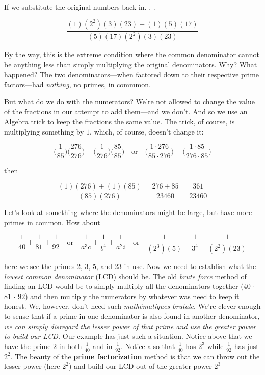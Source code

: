 \documentclass[koma]{article}
\begin{document}
\begin{itemize}
If we substitute the original numbers back in. . .

\[
  \frac{(1)(2^2)(3)(23) + (1)(5)(17)}{(5)(17)(2^2)(3)(23)}
  \]

By the way, this is the extreme condition where the common denominator cannot be anything less than simply multiplying the original denominators. Why? What happened? The two denominators---when factored down to their respective prime factors---had \emph{nothing}, no primes, in commmon.

But what do we do with the numerators? We're not allowed to change the value of the fractions in our attempt to add them---and we don't. And so we use an Algebra trick to keep the fractions the same value. The trick, of course, is multiplying something by \(1\), which, of course, doesn't change it:

\[
  \bigg(\frac{1}{85}\bigg)\bigg(\frac{276}{276}\bigg) + \bigg(\frac{1}{276}\bigg)\bigg(\frac{85}{85}\bigg) \quad \textrm{or} \quad  \bigg(\frac{1\cdot276}{85\cdot276}\bigg) + \bigg(\frac{1\cdot85}{276\cdot85}\bigg)
  \]

then

\[
  \frac{(1)(276) + (1)(85)}{(85)(276)} = \frac{276 + 85}{23460} = \frac{361}{23460}
  \]

Let's look at something where the denominators might be large, but have more primes in common. How about

\[
  \frac{1}{40} + \frac{1}{81} + \frac{1}{92} \quad \textrm{or} \quad \frac{1}{a^3c} + \frac{1}{b^4} + \frac{1}{a^2i} \quad \textrm{or} \quad \frac{1}{(2^3)(5)} + \frac{1}{3^4} + \frac{1}{(2^2)(23)} 
  \]

here we see the primes \(2\), \(3\), \(5\), and  \(23\) in use. Now we need to establish what the \emph{lowest common denominator} (LCD) should be. The old \emph{brute force} method of finding an LCD would be to simply multiply all the denominators together (\(40\) \(\cdot\) \(81\) \(\cdot\) \(92\)) and then multiply the numerators by whatever was need to keep it honest. We, however, don't need such \emph{mathématiques brutale}. We're clever enough to sense that if a prime in one denominator is also found in another denominator, \emph{we can simply disregard the lesser power of that prime and use the greater power to build our LCD.} Our example has just such a situation. Notice above that we have the prime \(2\) in both \(\frac{1}{40}\) and in \(\frac{1}{92}\). Notice also that \(\frac{1}{40}\) has \(2^3\) while \(\frac{1}{92}\) has just \(2^2\). The beauty of the \textbf{prime factorization} method is that we can throw out the lesser power (here \(2^2\)) and build our LCD out of the greater power \(2^3\)


\end{itemize}
\end{document}
